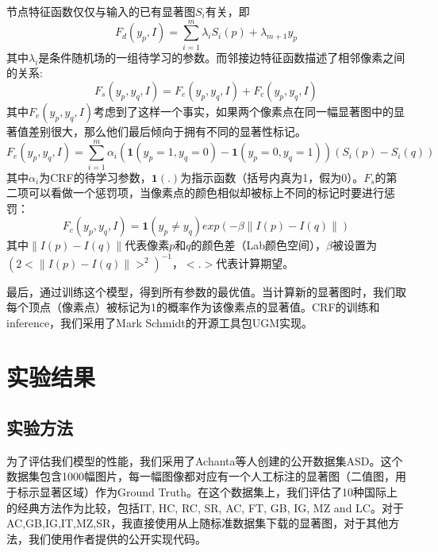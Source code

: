 节点特征函数仅仅与输入的已有显著图$S_i$有关，即
\begin{equation}
F_d(y_p, I) = \sum_{i=1}^{m} \lambda_iS_i(p) + \lambda_{m+1}y_p
\end{equation}
其中$\lambda_i$是条件随机场的一组待学习的参数。而邻接边特征函数描述了相邻像素之间的关系:
\begin{equation}
F_s(y_p,y_q,I) = F_e(y_p,y_q,I) + F_c(y_p,y_q,I)
\end{equation}
其中$F_e(y_p,y_q,I)$考虑到了这样一个事实，如果两个像素点在同一幅显著图中的显著值差别很大，那么他们最后倾向于拥有不同的显著性标记。
\begin{equation}
  F_e(y_p,y_q,I) = \sum_{i=1}^{m}\alpha_i(\textbf{1}(y_p=1,y_q=0)-\textbf{1}(y_p=0,y_q=1))(S_i(p)-S_i(q))
\end{equation}
其中$\alpha_i$为CRF的待学习参数，$\textbf{1}(.)$为指示函数（括号内真为1，假为0）。$F_s$的第二项可以看做一个惩罚项，当像素点的颜色相似却被标上不同的标记时要进行惩罚：
\begin{equation}
F_c(y_p,y_q,I)=\textbf{1}(y_p \not= y_q) exp(-\beta \parallel I(p)-I(q) \parallel )
\end{equation}
其中$\parallel I(p)-I(q) \parallel$代表像素$p$和$q$的颜色差（Lab颜色空间），$\beta$被设置为$(2<\parallel I(p)-I(q) \parallel>^2)^{-1}$，$<.>$代表计算期望。

最后，通过训练这个模型，得到所有参数的最优值。当计算新的显著图时，我们取每个顶点（像素点）被标记为1的概率作为该像素点的显著值。CRF的训练和inference，我们采用了Mark Schmidt的开源工具包UGM\cite{UGM_software}实现。

\section{实验结果}
\subsection{实验方法}
为了评估我们模型的性能，我们采用了Achanta等人创建的公开数据集ASD\cite{achanta2009frequency}。这个数据集包含1000幅图片，每一幅图像都对应有一个人工标注的显著图（二值图，用于标示显著区域）作为Ground Truth。在这个数据集上，我们评估了10种国际上的经典方法作为比较，包括IT\cite{itti1998model}, HC\cite{cheng2011global}, RC\cite{cheng2011global}, SR\cite{hou2007saliency}, AC\cite{achanta2008salient}, FT\cite{achanta2009frequency}, GB\cite{harel2006graph}, IG\cite{achanta2009frequency}, MZ\cite{ma2003contrast} and LC\cite{zhai2006visual}。对于AC,GB,IG,IT,MZ,SR，我直接使用从\cite{achanta2009frequency}上随标准数据集下载的显著图，对于其他方法，我们使用作者提供的公开实现代码。

